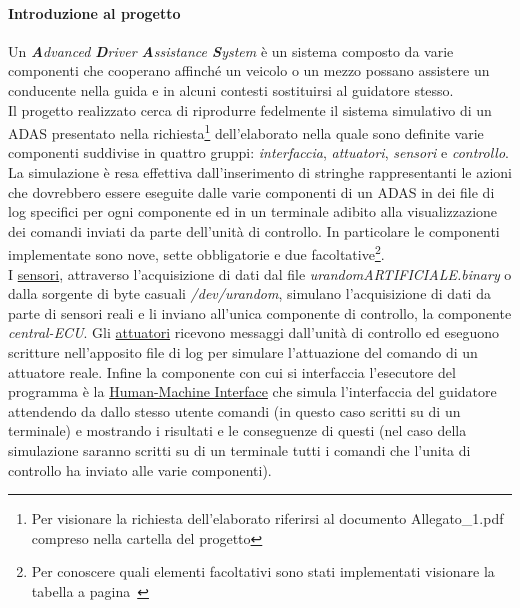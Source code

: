 \documentclass[11pt, openany]{article}
\theoremstyle{definition}
\theoremstyle{plain}
\theoremstyle{remark}
\begin{document}
		\paragraph{Introduzione al progetto}
			Un \textit{\textbf{A}dvanced \textbf{D}river \textbf{A}ssistance \textbf{S}ystem} è un sistema composto da varie componenti che cooperano affinché un veicolo o un mezzo possano assistere un conducente nella guida e in alcuni contesti sostituirsi al guidatore stesso.\\
			Il progetto realizzato cerca di riprodurre fedelmente il sistema simulativo di un ADAS presentato nella richiesta\footnote{Per visionare la richiesta dell'elaborato riferirsi al documento Allegato\_1.pdf compreso nella cartella del progetto} dell'elaborato nella quale sono definite varie componenti suddivise in quattro gruppi: \textit{interfaccia}, \textit{attuatori}, \textit{sensori} e \textit{controllo}.\\
			La simulazione è resa effettiva dall'inserimento di stringhe rappresentanti le azioni che dovrebbero essere eseguite dalle varie componenti di un ADAS in dei file di log specifici per ogni componente ed in un terminale adibito alla visualizzazione dei comandi inviati da parte dell'unità di controllo. In particolare le componenti implementate sono nove, sette obbligatorie e due facoltative\footnote{Per conoscere quali elementi facoltativi sono stati implementati visionare la tabella a pagina~\pageref{tab:facoltativi}}.\\
			I \underline{sensori}, attraverso l'acquisizione di dati dal file \textit{urandomARTIFICIALE.binary} o dalla sorgente di byte casuali \textit{/dev/urandom}, simulano l'acquisizione di dati da parte di sensori reali e li inviano all'unica componente di controllo, la componente \textit{central-ECU}.
			Gli \underline{attuatori} ricevono messaggi dall'unità di controllo ed eseguono scritture nell'apposito file di log per simulare l'attuazione del comando di un attuatore reale. Infine la componente con cui si interfaccia l'esecutore del programma è la \underline{Human-Machine Interface} che simula l'interfaccia del guidatore attendendo da dallo stesso utente comandi (in questo caso scritti su di un terminale) e mostrando i risultati e le conseguenze di questi (nel caso della simulazione saranno scritti su di un terminale tutti i comandi che l'unita di controllo ha inviato alle varie componenti).
\end{document}
